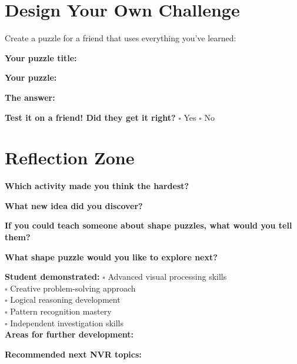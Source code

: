 \documentclass{article}
\begin{document}
\section{Design Your Own Challenge}

Create a puzzle for a friend that uses everything you've learned:

\textbf{Your puzzle title:} \underline{\hspace{6cm}}

\textbf{Your puzzle:}
\vspace{4cm}

\textbf{The answer:} \underline{\hspace{6cm}}

\textbf{Test it on a friend! Did they get it right?} $\square$ Yes $\square$ No

\section*{Reflection Zone}

\textbf{Which activity made you think the hardest?} \underline{\hspace{6cm}}

\textbf{What new idea did you discover?} \underline{\hspace{8cm}}

\textbf{If you could teach someone about shape puzzles, what would you tell them?}

\underline{\hspace{10cm}}

\textbf{What shape puzzle would you like to explore next?} \underline{\hspace{6cm}}

\vspace{1cm}

\begin{tcolorbox}[colback=orange!10,colframe=orange!60,title=Teacher Assessment Notes]
\textbf{Student demonstrated:}
$\square$ Advanced visual processing skills\\
$\square$ Creative problem-solving approach\\
$\square$ Logical reasoning development\\
$\square$ Pattern recognition mastery\\
$\square$ Independent investigation skills\\

\textbf{Areas for further development:} \underline{\hspace{8cm}}

\textbf{Recommended next NVR topics:} \underline{\hspace{8cm}}
\end{tcolorbox}
\end{document}
